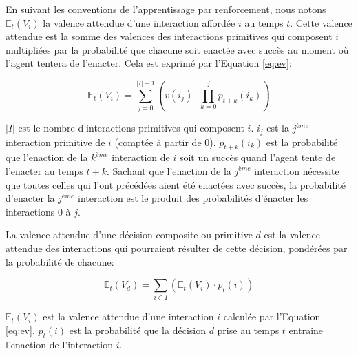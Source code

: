 En suivant les conventions de l'apprentissage par renforcement, nous notons $\mathbb{E}_t(V_i)$ la valence attendue d'une interaction affordée $i$ au temps $t$. 
Cette valence attendue est la somme des valences des interactions primitives qui composent $i$ multipliées par la probabilité que chacune soit enactée avec succès au moment où l'agent tentera de l'enacter. 
Cela est exprimé par l'Equation \eqref{eq:ev}:


\begin{equation}\label{eq:ev}
	\mathbb{E}_t(V_i) = \sum_{j=0}^{|I|-1} ( v(i_j) \cdot \prod_{k=0}^{j} p_{t+k}(i_k) )
\end{equation}

$|I|$ est le nombre d'interactions primitives qui composent $i$. 
$i_j$ est la $j^{ème}$ interaction primitive de $i$ (comptée à partir de 0).
$p_{t+k}(i_k)$ est la probabilité que l'enaction de la $k^{ème}$ interaction de $i$ soit un succès quand l'agent tente de l'enacter au temps $t+k$.
Sachant que l'enaction de la $j^{ème}$ interaction nécessite que toutes celles qui l'ont précédées aient été enactées avec succès, la probabilité d'enacter la $j^{ème}$ interaction est le produit des probabilités d'énacter les interactions 0 à $j$.

La valence attendue d'une décision composite ou primitive $d$ est la valence attendue des interactions qui pourraient résulter de cette décision, pondérées par la probabilité de chacune: 

\begin{equation}\label{eq:ed}
	\mathbb{E}_t(V_d) = \sum_{i \in I} ( \mathbb{E}_t(V_i) \cdot p_t(i) )
\end{equation}

$\mathbb{E}_t(V_i)$ est la valence attendue d'une interaction $i$ calculée par l'Equation \eqref{eq:ev}. 
$p_t(i)$ est la probabilité que la décision $d$ prise au temps $t$ entraine l'enaction de l'interaction $i$. 

